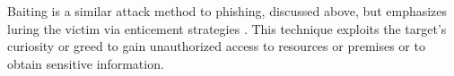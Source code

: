 Baiting is a similar attack method to phishing, discussed above, but emphasizes luring the victim via enticement strategies \citep{conteh_cybersecurityrisks_2016, salahdine_social_2019}. This technique exploits the target's curiosity or greed to gain unauthorized access to resources or premises or to obtain sensitive information.


















